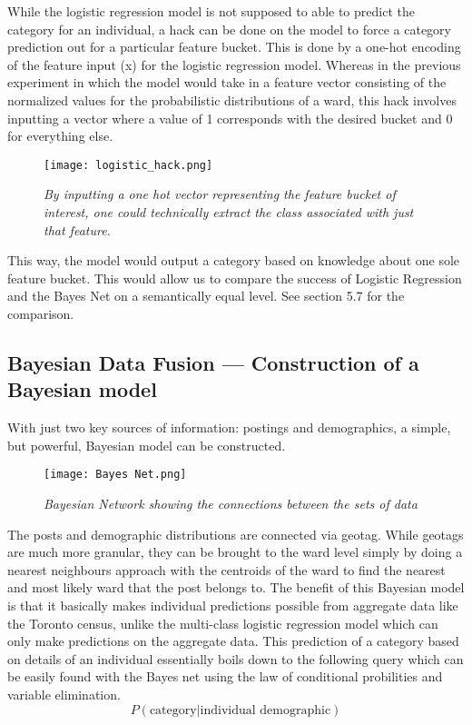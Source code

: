 \documentclass[12pt]{article}
\begin{document}
While the logistic regression model is not supposed to able to predict the category for an individual, a hack can be done on the model to force a category prediction out for a particular feature bucket. This is done by a one-hot encoding of the feature input (x) for the logistic regression model. Whereas in the previous experiment in which the model would take in a feature vector consisting of the normalized values for the probabilistic distributions of a ward, this hack involves inputting a vector where a value of 1 corresponds with the desired bucket and 0 for everything else. 

\begin{figure}[h]
\centering
\texttt{[image: logistic\_hack.png]}
\caption{\textit{By inputting a one hot vector representing the feature bucket of interest, one could technically extract the class associated with just that feature.}}
\end{figure}

This way, the model would output a category based on knowledge about one sole feature bucket. This would allow us to compare the success of Logistic Regression and the Bayes Net on a semantically equal level. See section 5.7 for the comparison. 

\subsection{Bayesian Data Fusion --- Construction of a Bayesian model}
With just two key sources of information: postings and demographics, a simple, but powerful, Bayesian model can be constructed.

\begin{figure}[h]
\centering
\texttt{[image: Bayes Net.png]}
\caption{\textit{Bayesian Network showing the connections between the sets of data}}
\end{figure}

The posts and demographic distributions are connected via geotag. While geotags are much more granular, they can be brought to the ward level simply by doing a nearest neighbours approach with the centroids of the ward to find the nearest and most likely ward that the post belongs to. 
The benefit of this Bayesian model is that it basically makes individual predictions possible from aggregate data like the Toronto census, unlike the multi-class logistic regression model which can only make predictions on the aggregate data. This prediction of a category based on details of an individual essentially boils down to the following query which can be easily found with the Bayes net using the law of conditional probilities and variable elimination.  \[P(\text{category} | \text{individual demographic})\]  
\end{document}
